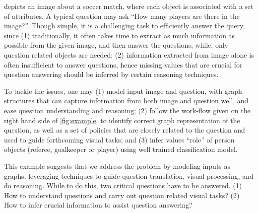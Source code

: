
\begin{example}
 depicts an image about a soccer match, where each object is associated with a set of attributes. A typical question may ask ``How many players are there in the image?''. Though simple, it is a challenging task to efficiently answer the query, since (1) traditionally, it often takes time to extract as much information as possible from the given image, and then answer the questions; while, only question related objects are needed; (2) information extracted from image alone is often insufficient to answer questions, hence missing values that are crucial for question answering should be inferred by certain reasoning techniques. 

To tackle the issues, one may (1) model input \ie image and question, with graph structures that can capture information from both image and question well, and ease question understanding and reasoning; (2) follow the work-flow given on the right hand side of \cref{fig:example} to identify correct graph representation of the question, as well as a set of policies that are closely related to the question and used to guide forthcoming visual tasks; and (3) infer values \eg ``role'' of person objects (referee, goalkeeper or player) using well trained classification model.  
\end{example}

This example suggests that we address the \vqa problem by modeling inputs as graphs, leveraging techniques to guide question translation, visual processing, and do reasoning. While to do this, two critical questions have to be answered. (1) How to understand questions and carry out question related visual tasks? (2) How to infer crucial information to assist question answering?  


